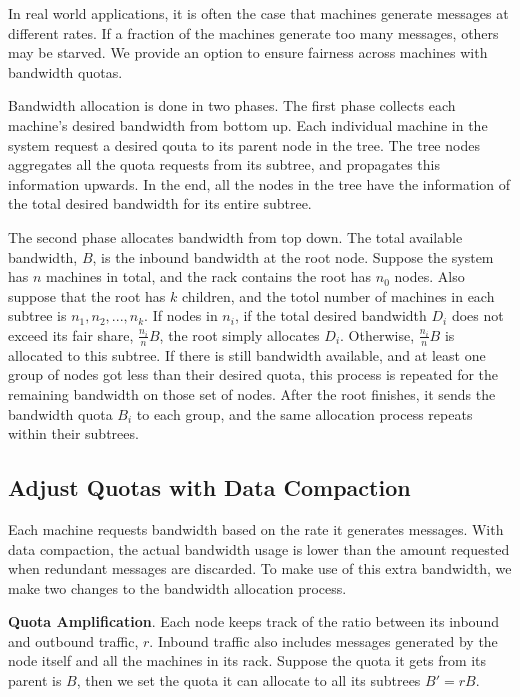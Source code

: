 In real world applications, it is often the case that machines generate
messages at different rates.  If a fraction of the machines generate too many
messages, others may be starved.  We provide an option to ensure fairness
across machines with bandwidth quotas.

Bandwidth allocation is done in two phases.  The first phase collects each
machine's desired bandwidth from bottom up.  Each individual machine in the
system request a desired qouta to its parent node in the tree.  The tree nodes
aggregates all the quota requests from its subtree, and propagates this
information upwards.  In the end, all the nodes in the tree have the
information of the total desired bandwidth for its entire subtree.

The second phase allocates bandwidth from top down.  The total available
bandwidth, $B$, is the inbound bandwidth at the root node.  Suppose the system
has $n$ machines in total, and the rack contains the root has $n_0$ nodes.
Also suppose that the root has $k$ children, and the totol number of machines
in each subtree is $n_1, n_2, ..., n_k$.  If nodes in $n_i$, if the total
desired bandwidth $D_i$ does not exceed its fair share, $\frac{n_i}{n}B$, the
root simply allocates $D_i$.  Otherwise, $\frac{n_i}{n}B$ is allocated to this
subtree.  If there is still bandwidth available, and at least one group of
nodes got less than their desired quota, this process is repeated for the
remaining bandwidth on those set of nodes.  After the root finishes, it sends
the bandwidth quota $B_i$ to each group, and the same allocation process
repeats within their subtrees.

\subsection*{Adjust Quotas with Data Compaction}

Each machine requests bandwidth based on the rate it generates messages.  With
data compaction, the actual bandwidth usage is lower than the amount requested
when redundant messages are discarded.  To make use of this extra bandwidth, we
make two changes to the bandwidth allocation process.

\textbf{Quota Amplification}.  Each node keeps track of the ratio between its
inbound and outbound traffic, $r$.  Inbound traffic also includes messages
generated by the node itself and all the machines in its rack.  Suppose the
quota it gets from its parent is $B$, then we set the quota it can allocate to
all its subtrees $B' = rB$.  

